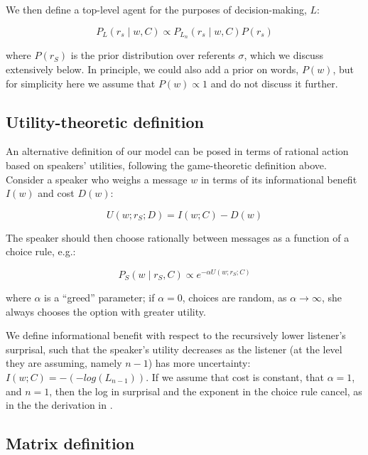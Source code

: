 We then define a top-level agent for the purposes of decision-making, $L$:

\begin{equation}
P_L (r_s \mid w, C) \propto P_{L_n} (r_s \mid w, C) P(r_s)
\end{equation}

\noindent where $P(r_S)$ is the prior distribution over referents $\sigma$, which we discuss extensively below. In principle, we could also add a prior on words, $P(w)$, but for simplicity here we assume that $P(w) \propto 1$ and do not discuss it further.

\subsection{Utility-theoretic definition}

An alternative definition of our model can be posed in terms of rational action based on speakers' utilities, following the game-theoretic definition above. Consider a speaker who weighs a message $w$ in terms of its informational benefit $I(w)$ and cost $D(w)$:

\begin{equation}
U(w; r_S; D) = I(w; C) - D(w)
\end{equation}

\noindent The speaker should then choose rationally between messages as a function of a choice rule, e.g.:

\begin{equation}
P_S(w \mid r_S, C) \propto e^{-\alpha U(w;r_S; C)}
\end{equation}

\noindent where $\alpha$ is a ``greed'' parameter; if $\alpha=0$, choices are random, as $\alpha \rightarrow \infty$, she always chooses the option with greater utility.

We define informational benefit with respect to the recursively lower listener's surprisal, such that the speaker's utility decreases as the listener (at the level they are assuming, namely $n-1$) has more uncertainty: $I(w; C) = -(-log(L_{n-1}))$. If we assume that cost is constant, that $\alpha=1$, and $n=1$, then the log in surprisal and the exponent in the choice rule cancel, as in the the derivation in . 

\subsection{Matrix definition}

